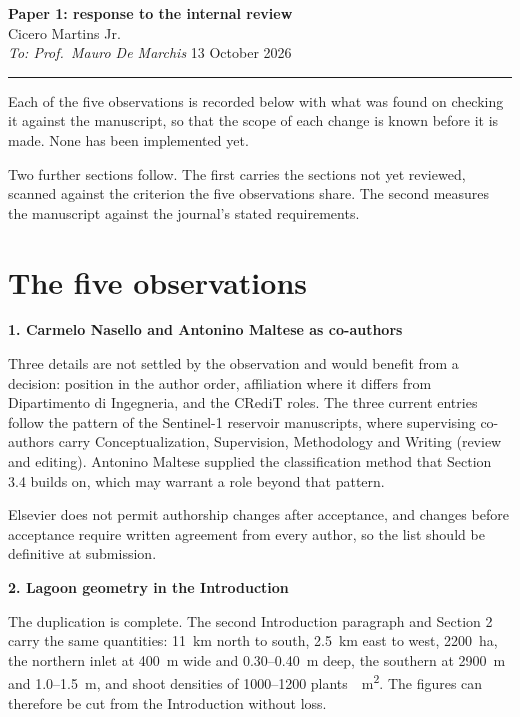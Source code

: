 \documentclass[11pt]{article}
\newcommand{\itemhead}[1]{\vspace{0.3em}\noindent\textbf{#1}\par}
\begin{document}
\thispagestyle{fancy}

\begin{center}
{\large\bfseries Paper 1: response to the internal review}\\[0.3em]
Cicero Martins Jr.\\
\textit{To: Prof.\ Mauro De Marchis} \hfill 13 October 2026
\end{center}

\vspace{0.2em}
\hrule
\vspace{0.5em}

Each of the five observations is recorded below with what was found on
checking it against the manuscript, so that the scope of each change is known
before it is made. None has been implemented yet.

Two further sections follow. The first carries the sections not yet reviewed,
scanned against the criterion the five observations share. The second measures
the manuscript against the journal's stated requirements.

\section{The five observations}

\itemhead{1. Carmelo Nasello and Antonino Maltese as co-authors}

Three details are not settled by the observation and would benefit from a
decision: position in the author order, affiliation where it differs from
Dipartimento di Ingegneria, and the CRediT roles. The three current entries
follow the pattern of the Sentinel-1 reservoir manuscripts, where supervising
co-authors carry Conceptualization, Supervision, Methodology and Writing
(review and editing). Antonino Maltese supplied the classification method that
Section 3.4 builds on, which may warrant a role beyond that pattern.

Elsevier does not permit authorship changes after acceptance, and changes
before acceptance require written agreement from every author, so the list
should be definitive at submission.

\itemhead{2. Lagoon geometry in the Introduction}

The duplication is complete. The second Introduction paragraph and Section 2
carry the same quantities: 11~km north to south, 2.5~km east to west, 2200~ha,
the northern inlet at 400~m wide and 0.30--0.40~m deep, the southern at 2900~m
and 1.0--1.5~m, and shoot densities of 1000--1200 plants~\si{\per\metre\squared}.
The figures can therefore be cut from the Introduction without loss.
\end{document}

